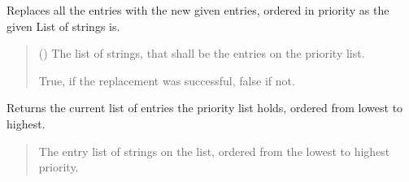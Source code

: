 \documentclass[letterpaper,10pt,english]{sphinxmanual}
\begin{document}
\begin{fulllineitems}
\begin{fulllineitems}
\label{\detokenize{apidoc/src.osm_configurator.view.utilityframes:src.osm_configurator.view.utilityframes.tag_list_priority_frame.TagListPriorityFrame.set_tag_list}}
\pysigstartsignatures
{}
\pysigstopsignatures
\sphinxAtStartPar
Replaces all the entries with the new given entries, ordered in priority as the given List of strings is.
\begin{quote}\begin{description}
\sphinxAtStartPar
{}\sphinxstyleliteralstrong{\sphinxupquote{{[}}}\sphinxstyleliteralstrong{\sphinxupquote{{]}}} () \textendash{} The list of strings, that shall be the entries on the priority list.

\sphinxAtStartPar
True, if the replacement was successful, false if not.

\sphinxAtStartPar
{}

\end{description}\end{quote}

\end{fulllineitems}


\begin{fulllineitems}
\label{\detokenize{apidoc/src.osm_configurator.view.utilityframes:src.osm_configurator.view.utilityframes.tag_list_priority_frame.TagListPriorityFrame.get_tag_list}}
\pysigstartsignatures
{}
\pysigstopsignatures
\sphinxAtStartPar
Returns the current list of entries the priority list holds, ordered from lowest to highest.
\begin{quote}\begin{description}
\sphinxAtStartPar
The entry list of strings on the list, ordered from the lowest to highest priority.

\sphinxAtStartPar
\sphinxhref{https://docs.python.org/3.11/library/stdtypes.html\#list}{list}{[}\sphinxhref{https://docs.python.org/3.11/library/stdtypes.html\#str}{str}{]}

\end{description}\end{quote}

\end{fulllineitems}
\end{fulllineitems}
\end{document}
